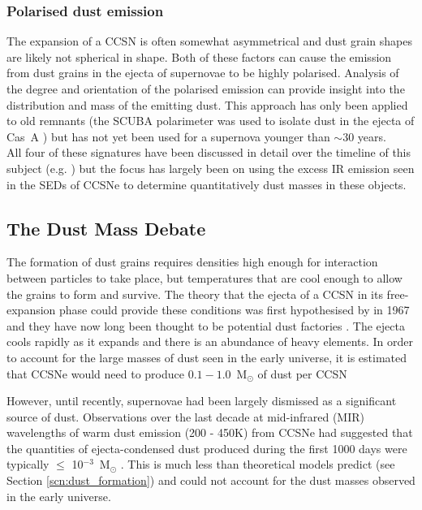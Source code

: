 \subsubsection{Polarised dust emission}
The expansion of a CCSN is often somewhat asymmetrical and dust grain shapes are likely not spherical in shape.  Both of these factors can cause the emission from dust grains in the ejecta of supernovae to be highly polarised.  Analysis of the degree and orientation of the polarised emission can provide insight into the distribution and mass of the emitting dust.  This approach has only been applied to old remnants (the SCUBA polarimeter was used to isolate dust in the ejecta of Cas~A \citep{Dunne2009}) but has not yet been used for a supernova younger than $\sim$30 years.
\\

\noindent All four of these signatures have been discussed in detail over the timeline of this subject (e.g. \citealt{Danziger1991,Bouchet1991,Bouchet1993,Sugerman2006,Gomez2013}) but the focus has largely been on using the excess IR emission seen in the SEDs of CCSNe to determine quantitatively dust masses in these objects.  
 

\subsection{The Dust Mass Debate}

The formation of dust grains requires densities high enough for interaction between particles to take place, but temperatures that are cool enough to allow the grains to form and survive.  The theory that the ejecta of a CCSN in its free-expansion phase could provide these conditions  was first hypothesised by \citeauthor{Cernuschi1967} in 1967 and they have now long been thought to be potential dust factories \citep{Hoyle1970, Kozasa1991, Todini2001,Nozawa2003,Cherchneff2010,Sarangi2013,Biscaro2014}.  The ejecta cools rapidly as it expands and there is an abundance of heavy elements.  In order to account for the large masses of dust seen in the early universe, it is estimated that CCSNe would need to produce  $0.1-1.0$~M$_\odot$ of dust per CCSN  \citep{Morgan2003, Dwek2007}

However, until recently, supernovae had been largely dismissed as a significant source of dust.  Observations over the last decade at mid-infrared (MIR) wavelengths of warm dust emission (200 - 450K)  from CCSNe had suggested that the quantities of ejecta-condensed dust produced during the first 1000 days were typically $\leq$ 10$^{-3}$~M$_\odot$  \citep{Sugerman2006, Meikle2007, Kotak2009, Andrews2010, Fabbri2011}.  This is much less than theoretical models predict (see Section \ref{scn:dust_formation}) and could not account for the dust masses observed in the early universe.  

